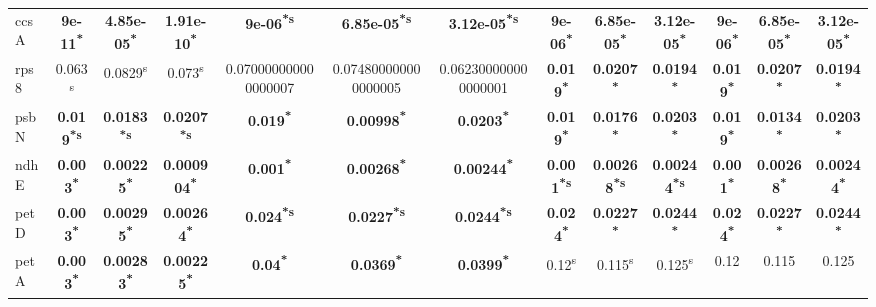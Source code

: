 \documentclass[a4paper]{article}
\begin{document}
\begin{longtable}{l|c|c|c|c|c|c|c|c|c|c|c|c}
ccsA&\textbf{9e-11\textsuperscript{*}}&\textbf{4.85e-05\textsuperscript{*}}&\textbf{1.91e-10\textsuperscript{*}}&\textbf{9e-06\textsuperscript{*}\textsuperscript{s}}&\textbf{6.85e-05\textsuperscript{*}\textsuperscript{s}}&\textbf{3.12e-05\textsuperscript{*}\textsuperscript{s}}&\textbf{9e-06\textsuperscript{*}}&\textbf{6.85e-05\textsuperscript{*}}&\textbf{3.12e-05\textsuperscript{*}}&\textbf{9e-06\textsuperscript{*}}&\textbf{6.85e-05\textsuperscript{*}}&\textbf{3.12e-05\textsuperscript{*}}\\
rps8&0.063\textsuperscript{s}&0.0829\textsuperscript{s}&0.073\textsuperscript{s}&0.070000000000000007&0.074800000000000005&0.062300000000000001&\textbf{0.019\textsuperscript{*}}&\textbf{0.0207\textsuperscript{*}}&\textbf{0.0194\textsuperscript{*}}&\textbf{0.019\textsuperscript{*}}&\textbf{0.0207\textsuperscript{*}}&\textbf{0.0194\textsuperscript{*}}\\
psbN&\textbf{0.019\textsuperscript{*}\textsuperscript{s}}&\textbf{0.0183\textsuperscript{*}\textsuperscript{s}}&\textbf{0.0207\textsuperscript{*}\textsuperscript{s}}&\textbf{0.019\textsuperscript{*}}&\textbf{0.00998\textsuperscript{*}}&\textbf{0.0203\textsuperscript{*}}&\textbf{0.019\textsuperscript{*}}&\textbf{0.0176\textsuperscript{*}}&\textbf{0.0203\textsuperscript{*}}&\textbf{0.019\textsuperscript{*}}&\textbf{0.0134\textsuperscript{*}}&\textbf{0.0203\textsuperscript{*}}\\
ndhE&\textbf{0.003\textsuperscript{*}}&\textbf{0.00225\textsuperscript{*}}&\textbf{0.000904\textsuperscript{*}}&\textbf{0.001\textsuperscript{*}}&\textbf{0.00268\textsuperscript{*}}&\textbf{0.00244\textsuperscript{*}}&\textbf{0.001\textsuperscript{*}\textsuperscript{s}}&\textbf{0.00268\textsuperscript{*}\textsuperscript{s}}&\textbf{0.00244\textsuperscript{*}\textsuperscript{s}}&\textbf{0.001\textsuperscript{*}}&\textbf{0.00268\textsuperscript{*}}&\textbf{0.00244\textsuperscript{*}}\\
petD&\textbf{0.003\textsuperscript{*}}&\textbf{0.00295\textsuperscript{*}}&\textbf{0.00264\textsuperscript{*}}&\textbf{0.024\textsuperscript{*}\textsuperscript{s}}&\textbf{0.0227\textsuperscript{*}\textsuperscript{s}}&\textbf{0.0244\textsuperscript{*}\textsuperscript{s}}&\textbf{0.024\textsuperscript{*}}&\textbf{0.0227\textsuperscript{*}}&\textbf{0.0244\textsuperscript{*}}&\textbf{0.024\textsuperscript{*}}&\textbf{0.0227\textsuperscript{*}}&\textbf{0.0244\textsuperscript{*}}\\
petA&\textbf{0.003\textsuperscript{*}}&\textbf{0.00283\textsuperscript{*}}&\textbf{0.00225\textsuperscript{*}}&\textbf{0.04\textsuperscript{*}}&\textbf{0.0369\textsuperscript{*}}&\textbf{0.0399\textsuperscript{*}}&0.12\textsuperscript{s}&0.115\textsuperscript{s}&0.125\textsuperscript{s}&0.12&0.115&0.125\\

\end{longtable}
\end{document}
